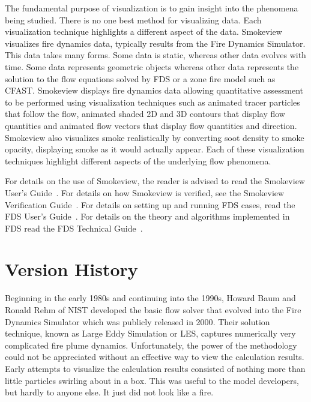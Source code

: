 \documentclass[11pt,twoside]{book}
\begin{document}
The fundamental purpose of visualization is to gain insight into
the phenomena being studied. There is no one best method for
visualizing data. Each visualization technique highlights a
different aspect of the data. Smokeview visualizes fire dynamics
data, typically results from the Fire Dynamics Simulator. This
data takes many forms.  Some data is static, whereas other data
evolves with time. Some data represents geometric objects whereas
other data represents the solution to the flow equations solved by
FDS or a zone fire model such as CFAST. Smokeview displays fire
dynamics data allowing quantitative assessment to be performed
using visualization techniques such as animated tracer particles
that follow the flow, animated shaded 2D and 3D contours that
display flow quantities and animated flow vectors that display
flow quantities and direction. Smokeview also visualizes smoke
realistically by converting soot density to smoke opacity,
displaying smoke as it would actually appear. Each of these
visualization techniques highlight different aspects of the
underlying flow phenomena.

For details on the use of Smokeview, the reader is advised to read
the Smokeview User's Guide~\cite{Smokeview_Users_Guide}. For
details on how Smokeview is verified, see the Smokeview
Verification Guide~\cite{Smokeview_Verification_Guide}.  For
details on setting up and running FDS cases, read the FDS User's
Guide~\cite{FDS_Users_Guide}.  For details on the theory and
algorithms implemented in FDS read the FDS Technical
Guide~\cite{FDS_Tech_Guide}.

%
%

\section{Version History}

Beginning in the early 1980s and continuing into the 1990s, Howard
Baum and Ronald Rehm of NIST developed the basic flow solver that
evolved into the Fire Dynamics Simulator which was publicly
released in 2000\cite{McGrattan:6}.  Their solution technique,
known as Large Eddy Simulation or LES, captures numerically very
complicated fire plume dynamics.  Unfortunately, the power of the
methodology could not be appreciated without an effective way to
view the calculation results.  Early attempts to visualize the
calculation results consisted of nothing more than little
particles swirling about in a box.  This was useful to the model
developers, but hardly to anyone else.  It just did not look like
a fire.
\end{document}

